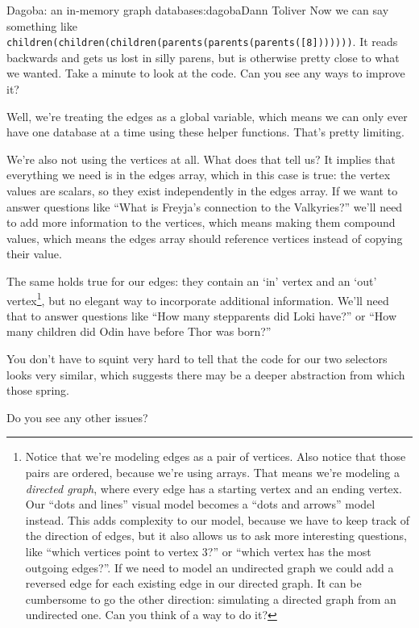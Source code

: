 \begin{aosachapter}{Dagoba: an in-memory graph database}{s:dagoba}{Dann Toliver}
Now we can say something like
\texttt{children(children(children(parents(parents(parents({[}8{]}))))))}.
It reads backwards and gets us lost in silly parens, but is otherwise
pretty close to what we wanted. Take a minute to look at the code. Can
you see any ways to improve it?

Well, we're treating the edges as a global variable, which means we can
only ever have one database at a time using these helper functions.
That's pretty limiting.

We're also not using the vertices at all. What does that tell us? It
implies that everything we need is in the edges array, which in this
case is true: the vertex values are scalars, so they exist independently
in the edges array. If we want to answer questions like ``What is
Freyja's connection to the Valkyries?'' we'll need to add more
information to the vertices, which means making them compound values,
which means the edges array should reference vertices instead of copying
their value.

The same holds true for our edges: they contain an `in' vertex and an
`out' vertex\footnote{Notice that we're modeling edges as a pair of
  vertices. Also notice that those pairs are ordered, because we're
  using arrays. That means we're modeling a \emph{directed graph}, where
  every edge has a starting vertex and an ending vertex. Our ``dots and
  lines'' visual model becomes a ``dots and arrows'' model instead. This
  adds complexity to our model, because we have to keep track of the
  direction of edges, but it also allows us to ask more interesting
  questions, like ``which vertices point to vertex 3?'' or ``which
  vertex has the most outgoing edges?''. If we need to model an
  undirected graph we could add a reversed edge for each existing edge
  in our directed graph. It can be cumbersome to go the other direction:
  simulating a directed graph from an undirected one. Can you think of a
  way to do it?}, but no elegant way to incorporate additional
information. We'll need that to answer questions like ``How many
stepparents did Loki have?'' or ``How many children did Odin have before
Thor was born?''

You don't have to squint very hard to tell that the code for our two
selectors looks very similar, which suggests there may be a deeper
abstraction from which those spring.

Do you see any other issues?

\label{build-a-better-graph}


\end{aosachapter}

